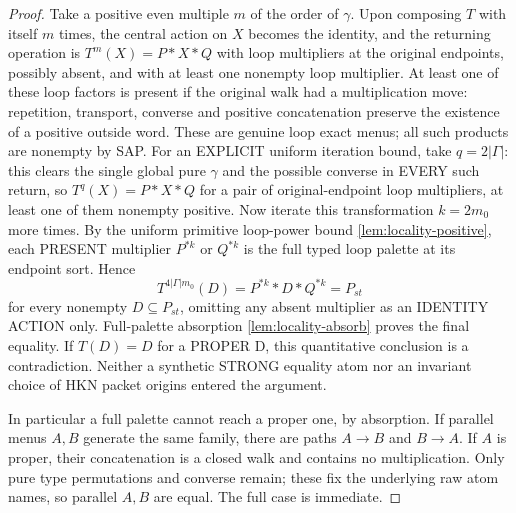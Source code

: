 \begin{proof}
Take a positive even multiple $m$ of the order of $\gamma$.
Upon composing $T$ with itself $m$ times, the central action
on $X$ becomes the identity, and the returning operation is
$T^m(X)=P*X*Q$ with loop multipliers at the original endpoints,
possibly absent, and with at least one nonempty loop multiplier.
At least one of these loop factors is present if the original
walk had a multiplication move: repetition, transport, converse and
positive concatenation preserve the existence of a positive outside
word.  These are genuine loop exact menus; all such products are
nonempty by SAP.  For an EXPLICIT uniform iteration bound, take
$q=2|\Gamma|$: this clears the single global pure
$\gamma$ and the possible converse in EVERY such return,
so $T^q(X)=P*X*Q$ for a pair of original-endpoint
loop multipliers, at least one of them nonempty positive.
Now iterate this transformation $k=2m_0$ more times.
By the uniform primitive loop-power bound
\cref{lem:locality-positive}, each PRESENT multiplier
$P^{*k}$ or $Q^{*k}$ is the full typed loop palette
at its endpoint sort.  Hence
\[
       T^{4|\Gamma|m_0}(D)
         = P^{*k}*D*Q^{*k}=P_{st}
\]
for every nonempty $D\subseteq P_{st}$, omitting
any absent multiplier as an IDENTITY ACTION only.
Full-palette absorption
\cref{lem:locality-absorb} proves the final equality.
If $T(D)=D$ for a PROPER D, this quantitative
conclusion is a contradiction.  Neither a synthetic
STRONG equality atom nor an invariant choice of HKN
packet origins entered the argument.

In particular a full palette cannot reach a proper one, by
absorption.  If parallel menus $A,B$ generate the same family,
there are paths $A\to B$ and $B\to A$.  If $A$ is proper,
their concatenation is a closed walk and contains no
multiplication.  Only pure type permutations and converse
remain; these fix the underlying raw atom names, so parallel
$A,B$ are equal.  The full case is immediate.
\end{proof}

